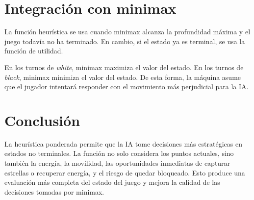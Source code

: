 \documentclass[12pt,letterpaper]{article}
\begin{document}
\section{Integración con minimax}

La función heurística se usa cuando minimax alcanza la profundidad máxima y el juego todavía no ha terminado. En cambio, si el estado ya es terminal, se usa la función de utilidad.

\begin{tcolorbox}[colframe=KEBlue,title=\textbf{Criterio de decisión},coltitle=white,colbacktitle=KEBlue]
En los turnos de \textit{white}, minimax maximiza el valor del estado. En los turnos de \textit{black}, minimax minimiza el valor del estado. De esta forma, la máquina asume que el jugador intentará responder con el movimiento más perjudicial para la IA.
\end{tcolorbox}

\section{Conclusión}

La heurística ponderada permite que la IA tome decisiones más estratégicas en estados no terminales. La función no solo considera los puntos actuales, sino también la energía, la movilidad, las oportunidades inmediatas de capturar estrellas o recuperar energía, y el riesgo de quedar bloqueado. Esto produce una evaluación más completa del estado del juego y mejora la calidad de las decisiones tomadas por minimax.
\end{document}
